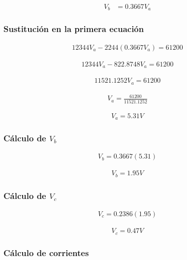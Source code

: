 \documentclass[conference]{IEEEtran}
\begin{document}
\begin{align*}
V_b&=0.3667V_a
\end{align*}

\subsubsection{Sustitución en la primera ecuación}

\begin{align*}
12344V_a-2244(0.3667V_a)=61200
\end{align*}

\begin{align*}
12344V_a-822.8748V_a=61200
\end{align*}

\begin{align*}
11521.1252V_a=61200
\end{align*}

\begin{align*}
V_a=\frac{61200}{11521.1252}
\end{align*}

\begin{align*}
V_a=5.31V
\end{align*}

\subsubsection{Cálculo de $V_b$}

\begin{align*}
V_b=0.3667(5.31)
\end{align*}

\begin{align*}
V_b=1.95V
\end{align*}

\subsubsection{Cálculo de $V_c$}

\begin{align*}
V_c=0.2386(1.95)
\end{align*}

\begin{align*}
V_c=0.47V
\end{align*}

\subsubsection{Cálculo de corrientes}
\end{document}
